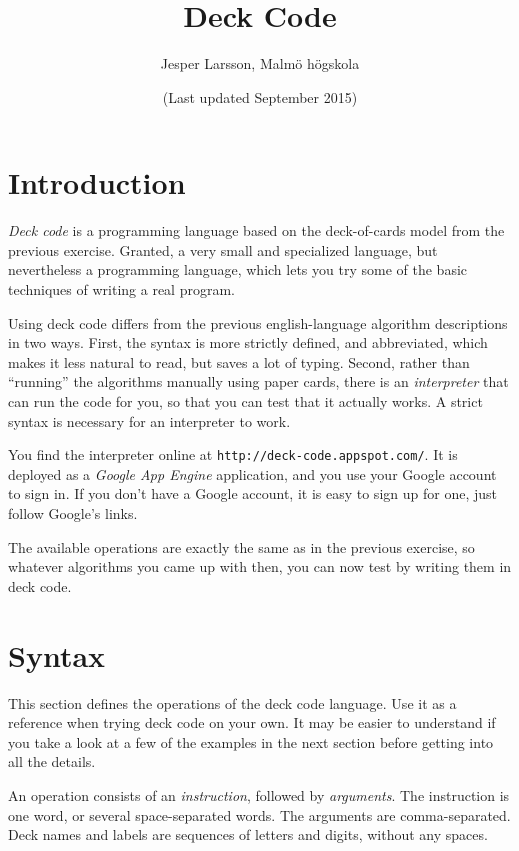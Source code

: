 \documentclass[a4paper,twoside]{tufte-handout}
\title{Deck Code}
\author{Jesper Larsson, Malmö högskola}
\date{(Last updated September 2015)}
\begin{document}
\maketitle


\section{Introduction}\label{sec-intro}

\emph{Deck code} is a programming language based on the deck-of-cards
model from the previous exercise. Granted, a very small and
specialized language, but nevertheless a programming language, which
lets you try some of the basic techniques of writing a real program.

Using deck code differs from the previous english-language algorithm
descriptions in two ways. First, the syntax is more strictly defined,
and abbreviated, which makes it less natural to read, but saves a
lot of typing. Second, rather than ``running'' the algorithms manually
using paper cards, there is an \emph{interpreter} that can run the
code for you, so that you can test that it actually works. A strict
syntax is necessary for an interpreter to work.

You find the interpreter online at
\verb$http://deck-code.appspot.com/$. It is deployed as a \emph{Google
  App Engine} application, and you use your Google account to sign
in. If you don't have a Google account, it is easy to sign up for one,
just follow Google's links.

The available operations are exactly the same as in the previous
exercise, so whatever algorithms you came up with then, you can now
test by writing them in deck code.

\section{Syntax}\label{sec-syntax}

This section defines the operations of the deck code language. Use it as a reference when trying deck code on your own. It may
be easier to understand if you take a look at a few of the examples in
the next section before getting into all the details.

An operation consists of an \emph{instruction}, followed by
\emph{arguments}. The instruction is one word, or several
space-separated words. The arguments are comma-separated. Deck names
and labels are sequences of letters and digits, without any spaces.
\end{document}
